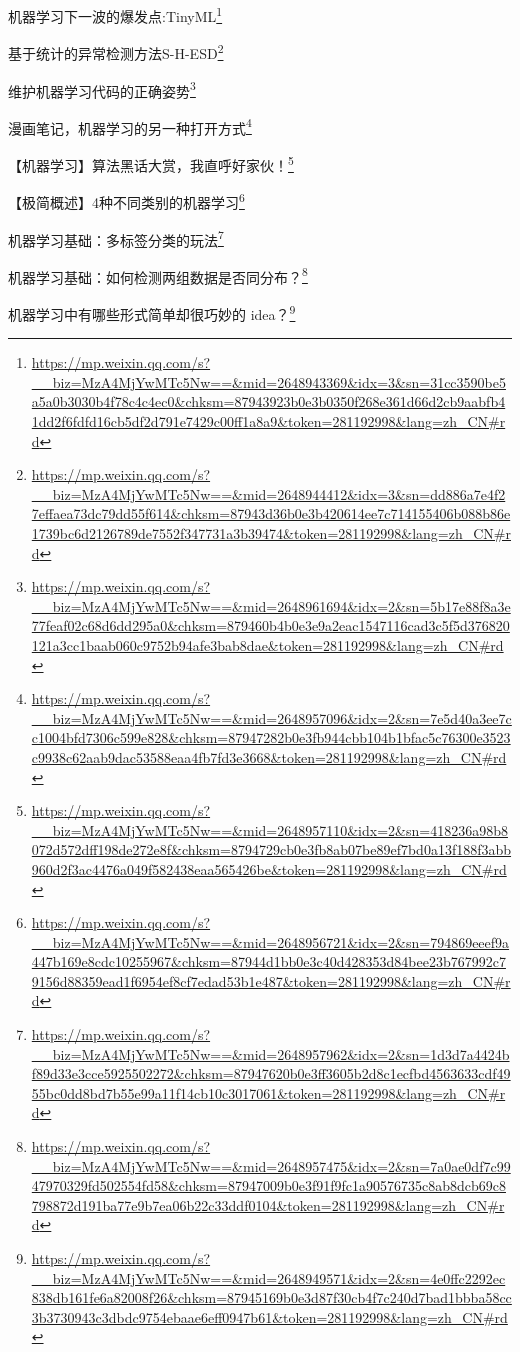 \documentclass[]{ctexbook}
\renewcommand{\href}[2]{#2\footnote{\url{#1}}}
\begin{document}
\href{https://mp.weixin.qq.com/s?__biz=MzA4MjYwMTc5Nw==\&mid=2648943369\&idx=3\&sn=31cc3590be5a5a0b3030b4f78c4c4ec0\&chksm=87943923b0e3b0350f268e361d66d2cb9aabfb41dd2f6fdfd16cb5df2d791e7429c00ff1a8a9\&token=281192998\&lang=zh_CN\#rd}{机器学习下一波的爆发点:TinyML}

\href{https://mp.weixin.qq.com/s?__biz=MzA4MjYwMTc5Nw==\&mid=2648944412\&idx=3\&sn=dd886a7e4f27effaea73dc79dd55f614\&chksm=87943d36b0e3b420614ee7c714155406b088b86e1739bc6d2126789de7552f347731a3b39474\&token=281192998\&lang=zh_CN\#rd}{基于统计的异常检测方法S-H-ESD}

\href{https://mp.weixin.qq.com/s?__biz=MzA4MjYwMTc5Nw==\&mid=2648961694\&idx=2\&sn=5b17e88f8a3e77feaf02c68d6dd295a0\&chksm=879460b4b0e3e9a2eac1547116cad3c5f5d376820121a3cc1baab060c9752b94afe3bab8dae\&token=281192998\&lang=zh_CN\#rd}{维护机器学习代码的正确姿势}

\href{https://mp.weixin.qq.com/s?__biz=MzA4MjYwMTc5Nw==\&mid=2648957096\&idx=2\&sn=7e5d40a3ee7cc1004bfd7306c599e828\&chksm=87947282b0e3fb944cbb104b1bfac5c76300e3523c9938c62aab9dac53588eaa4fb7fd3e3668\&token=281192998\&lang=zh_CN\#rd}{漫画笔记，机器学习的另一种打开方式}

\href{https://mp.weixin.qq.com/s?__biz=MzA4MjYwMTc5Nw==\&mid=2648957110\&idx=2\&sn=418236a98b8072d572dff198de272e8f\&chksm=8794729cb0e3fb8ab07be89ef7bd0a13f188f3abb960d2f3ac4476a049f582438eaa565426be\&token=281192998\&lang=zh_CN\#rd}{【机器学习】算法黑话大赏，我直呼好家伙！}

\href{https://mp.weixin.qq.com/s?__biz=MzA4MjYwMTc5Nw==\&mid=2648956721\&idx=2\&sn=794869eeef9a447b169e8cdc10255967\&chksm=87944d1bb0e3c40d428353d84bee23b767992c79156d88359ead1f6954ef8cf7edad53b1e487\&token=281192998\&lang=zh_CN\#rd}{【极简概述】4种不同类别的机器学习}

\href{https://mp.weixin.qq.com/s?__biz=MzA4MjYwMTc5Nw==\&mid=2648957962\&idx=2\&sn=1d3d7a4424bf89d33e3cce5925502272\&chksm=87947620b0e3ff3605b2d8c1ecfbd4563633cdf4955bc0dd8bd7b55e99a11f14cb10c3017061\&token=281192998\&lang=zh_CN\#rd}{机器学习基础：多标签分类的玩法}

\href{https://mp.weixin.qq.com/s?__biz=MzA4MjYwMTc5Nw==\&mid=2648957475\&idx=2\&sn=7a0ae0df7c9947970329fd502554fd58\&chksm=87947009b0e3f91f9fc1a90576735c8ab8dcb69c8798872d191ba77e9b7ea06b22c33ddf0104\&token=281192998\&lang=zh_CN\#rd}{机器学习基础：如何检测两组数据是否同分布？}

\href{https://mp.weixin.qq.com/s?__biz=MzA4MjYwMTc5Nw==\&mid=2648949571\&idx=2\&sn=4e0ffc2292ec838db161fe6a82008f26\&chksm=87945169b0e3d87f30cb4f7c240d7bad1bbba58cc3b3730943c3dbdc9754ebaae6eff0947b61\&token=281192998\&lang=zh_CN\#rd}{机器学习中有哪些形式简单却很巧妙的 idea？}
\end{document}
